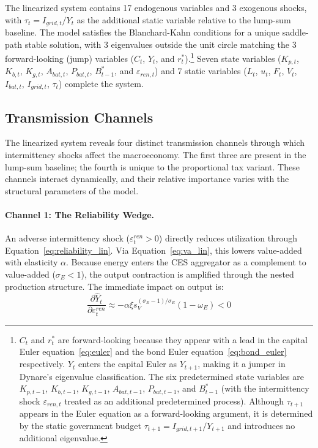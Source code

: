 \documentclass[12pt, a4paper]{article}
\begin{document}
	The linearized system contains 17 endogenous variables and 3 exogenous shocks, with $\tau_t = I_{grid,t}/Y_t$ as the additional static variable relative to the lump-sum baseline. The model satisfies the Blanchard-Kahn conditions \citep{blanchard1980} for a unique saddle-path stable solution, with 3 eigenvalues outside the unit circle matching the 3 forward-looking (jump) variables ($C_t$, $Y_t$, and $r^*_t$).\footnote{$C_t$ and $r^*_t$ are forward-looking because they appear with a lead in the capital Euler equation~\eqref{eq:euler} and the bond Euler equation~\eqref{eq:bond_euler} respectively. $Y_t$ enters the capital Euler as $Y_{t+1}$, making it a jumper in Dynare's eigenvalue classification. The six predetermined state variables are $K_{p,t-1}$, $K_{b,t-1}$, $K_{g,t-1}$, $A_{bat,t-1}$, $P_{bat,t-1}$, and $B^*_{t-1}$ (with the intermittency shock $\varepsilon_{ren,t}$ treated as an additional predetermined process). Although $\tau_{t+1}$ appears in the Euler equation as a forward-looking argument, it is determined by the static government budget $\tau_{t+1} = I_{grid,t+1}/Y_{t+1}$ and introduces no additional eigenvalue.} Seven state variables ($K_{p,t}$, $K_{b,t}$, $K_{g,t}$, $A_{bat,t}$, $P_{bat,t}$, $B^*_{t-1}$, and $\varepsilon_{ren,t}$) and 7 static variables ($L_t$, $u_t$, $F_t$, $V_t$, $I_{bat,t}$, $I_{grid,t}$, $\tau_t$) complete the system.
	
	\subsection{Transmission Channels} \label{subsec:transmission}
	
	The linearized system reveals four distinct transmission channels through which intermittency shocks affect the macroeconomy. The first three are present in the lump-sum baseline; the fourth is unique to the proportional tax variant. These channels interact dynamically, and their relative importance varies with the structural parameters of the model.
	
	\paragraph{Channel 1: The Reliability Wedge.}
	An adverse intermittency shock ($\varepsilon^{ren}_t > 0$) directly reduces utilization through Equation~\eqref{eq:reliability_lin}. Via Equation~\eqref{eq:va_lin}, this lowers value-added with elasticity $\alpha$. Because energy enters the CES aggregator as a complement to value-added ($\sigma_E < 1$), the output contraction is amplified through the nested production structure. The immediate impact on output is:
	\begin{equation}
		\frac{\partial \hat{Y}_t}{\partial \varepsilon^{ren}_t} \approx -\alpha \xi s_V^{(\sigma_E-1)/\sigma_E}(1-\omega_E) < 0
	\end{equation}
	
\end{document}
